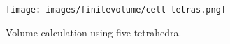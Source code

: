 \begin{figure}[ht]
    \centering
    \texttt{[image: images/finitevolume/cell-tetras.png]}
    \caption{Volume calculation using five tetrahedra.}
    \label{fig:finitevolume-cell-tetras}
\end{figure}
